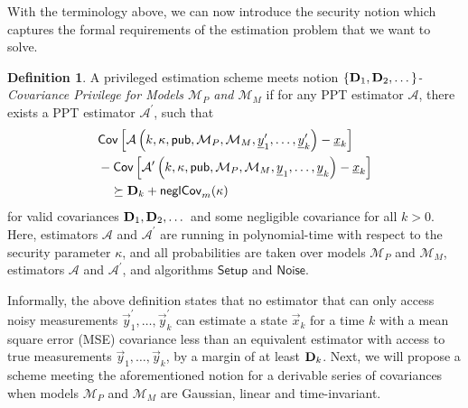 \documentclass[letterpaper, 10 pt, conference]{IEEEtran}
\theoremstyle{definition}
\newtheorem{definition}{Definition}[section]
\theoremstyle{definition}
\theoremstyle{remark}
\begin{document}
With the terminology above, we can now introduce the security notion which captures the formal requirements of the estimation problem that we want to solve.
\begin{definition}\label{def:cov_privilege_security_notion}
   A privileged estimation scheme meets notion \textit{$\{{{\mathbf{D}}}_1,{{\mathbf{D}}}_2,\dots\}$-Covariance Privilege for Models $\mathcal{M}_P$ and $\mathcal{M}_M$} if for any PPT estimator $\mathcal{A}$, there exists a PPT estimator $\mathcal{A}^\prime$, such that
   \begin{equation}\label{eqn:cov_privilege}
      \begin{split}
         &\mathsf{Cov}\left[\mathcal{A}\left(k, \kappa, \mathsf{pub}, \mathcal{M}_P, \mathcal{M}_M, \vec{y}^\prime_1,\dots,\vec{y}^\prime_k\right) - \vec{x}_k \right]\\
         &-\mathsf{Cov}\left[\mathcal{A}^\prime\left(k, \kappa, \mathsf{pub}, \mathcal{M}_P, \mathcal{M}_M, \vec{y}_1,\dots,\vec{y}_k\right) - \vec{x}_k \right]\\
         &\quad\succeq \mat{D}_k + \mathsf{neglCov}_m(\kappa)
      \end{split}
   \end{equation}
   for valid covariances ${{\mathbf{D}}}_1,{{\mathbf{D}}}_2,\dots$ and some negligible covariance for all $k>0$. Here, estimators $\mathcal{A}$ and $\mathcal{A}^\prime$ are running in polynomial-time with respect to the security parameter $\kappa$, and all probabilities are taken over models $\mathcal{M}_P$ and $\mathcal{M}_M$, estimators $\mathcal{A}$ and $\mathcal{A}^\prime$, and algorithms $\mathsf{Setup}$ and $\mathsf{Noise}$.
\end{definition}

Informally, the above definition states that no estimator that can only access noisy measurements $\vec{y}^\prime_1,\dots,\vec{y}^\prime_k$ can estimate a state $\vec{x}_k$ for a time $k$ with a mean square error (MSE) covariance less than an equivalent estimator with access to true measurements $\vec{y}_1,\dots,\vec{y}_k$, by a margin of at least ${{\mathbf{D}}}_k$. Next, we will propose a scheme meeting the aforementioned notion for a derivable series of covariances when models $\mathcal{M}_P$ and $\mathcal{M}_M$ are Gaussian, linear and time-invariant.

% 
%                                                                                
%                                                                                
%                                                                                
% 
\end{document}
